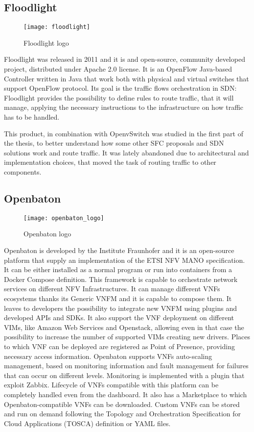 \subsection{Floodlight}
\begin{figure}[h]
 \centering \texttt{[image: floodlight]}
 \caption{Floodlight logo}
 \label{chap:prjan:img:floodlight_logo}
\end{figure}
Floodlight was released in 2011 and it is and open-source, community developed
project, distributed under Apache 2.0 license. It is an OpenFlow Java-based
Controller written in Java that work both with physical and virtual switches
that support OpenFlow protocol. Its goal is the traffic flows orchestration in
SDN: Floodlight provides the possibility to define rules to route traffic, that
it will manage, applying the necessary instructions to the infrastructure on how
traffic has to be handled.

This product, in combination with OpenvSwitch was studied in the first part of
the thesis, to better understand how some other SFC proposals and SDN solutions
work and route traffic. It was lately abandoned due to architectural and
implementation choices, that moved the task of routing traffic to other
components.

\subsection{Openbaton}
\begin{figure}[h]
  \centering \texttt{[image: openbaton\_logo]}
  \caption{Openbaton logo}
  \label{chap:prjan:img:openbaton_logo}
\end{figure}
Openbaton is developed by the Institute Fraunhofer and it is an open-source
platform that supply an implementation of the ETSI NFV MANO specification. It
can be either installed as a normal program or run into containers from a Docker
Compose definition. This framework is capable to orchestrate network services on
different NFV Infrastructures. It can manage different VNFs ecosystems thanks
its Generic VNFM and it is capable to compose them. It leaves to developers the
possibility to integrate new VNFM using plugins and developed APIs and SDKs. It
also support the VNF deployment on different VIMs, like Amazon Web Services and
Openstack, allowing even in that case the possibility to increase the number of
supported VIMs creating new drivers. Places to which VNF can be deployed are
registered as Point of Presence, providing necessary access information.
Openbaton supports VNFs auto-scaling management, based on monitoring information
and fault management for failures that can occur on different levels. Monitoring
is implemented with a plugin that exploit Zabbix. Lifecycle of VNFs compatible
with this platform can be completely handled even from the dashboard. It also
has a Marketplace to which Openbaton-compatible VNFs can be downloaded. Custom
VNFs can be stored and run on demand following the Topology and Orchestration
Specification for Cloud Applications (TOSCA) definition or YAML files.

